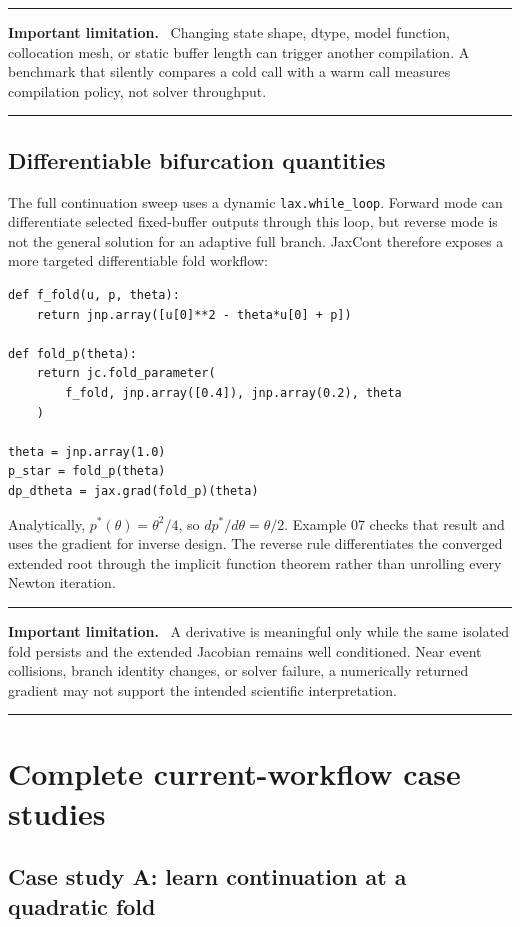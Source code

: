 \documentclass[11pt,oneside]{book}
\newenvironment{warningbox}
  {\par\medskip\noindent\begin{minipage}{\textwidth}
   \color{JaxRed}\rule{\textwidth}{0.8pt}\par
   \textbf{Important limitation.}\ \color{black}}
  {\par\color{JaxRed}\rule{\textwidth}{0.8pt}
   \end{minipage}\par\medskip}
\begin{document}
\begin{warningbox}
Changing state shape, dtype, model function, collocation mesh, or static buffer
length can trigger another compilation. A benchmark that silently compares a
cold call with a warm call measures compilation policy, not solver throughput.
\end{warningbox}

\section{Differentiable bifurcation quantities}

The full continuation sweep uses a dynamic \texttt{lax.while\_loop}. Forward
mode can differentiate selected fixed-buffer outputs through this loop, but
reverse mode is not the general solution for an adaptive full branch. JaxCont
therefore exposes a more targeted differentiable fold workflow:

\begin{lstlisting}
def f_fold(u, p, theta):
    return jnp.array([u[0]**2 - theta*u[0] + p])

def fold_p(theta):
    return jc.fold_parameter(
        f_fold, jnp.array([0.4]), jnp.array(0.2), theta
    )

theta = jnp.array(1.0)
p_star = fold_p(theta)
dp_dtheta = jax.grad(fold_p)(theta)
\end{lstlisting}

Analytically, $p^*(\theta)=\theta^2/4$, so
$dp^*/d\theta=\theta/2$. Example 07 checks that result and uses the gradient
for inverse design. The reverse rule differentiates the converged extended
root through the implicit function theorem rather than unrolling every Newton
iteration.

\begin{warningbox}
A derivative is meaningful only while the same isolated fold persists and the
extended Jacobian remains well conditioned. Near event collisions, branch
identity changes, or solver failure, a numerically returned gradient may not
support the intended scientific interpretation.
\end{warningbox}

\chapter{Complete current-workflow case studies}

\section{Case study A: learn continuation at a quadratic fold}
\end{document}
